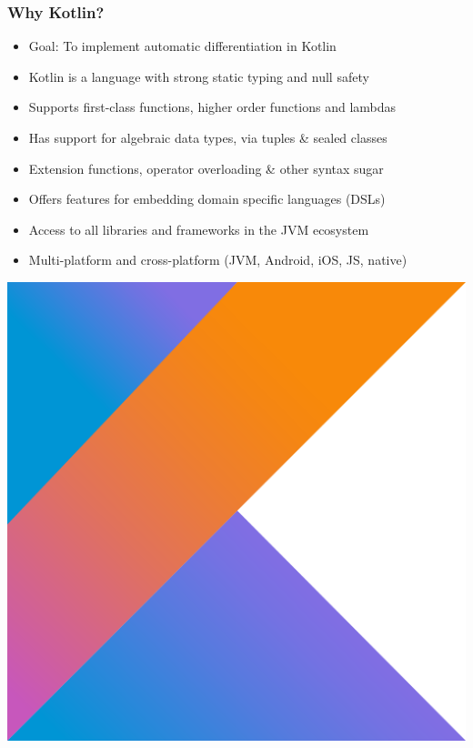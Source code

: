 \documentclass{beamer}
\begin{document}

    \begin{frame}
        \frametitle{Why Kotlin?}
        \begin{itemize}
            \item Goal: To implement automatic differentiation in Kotlin
            \item Kotlin is a language with strong static typing and null safety
            \item Supports first-class functions, higher order functions and lambdas
            \item Has support for algebraic data types, via tuples & sealed classes
            \item Extension functions, operator overloading & other syntax sugar
            \item Offers features for embedding domain specific languages (DSLs)
            \item Access to all libraries and frameworks in the JVM ecosystem
            \item Multi-platform and cross-platform (JVM, Android, iOS, JS, native)
        \end{itemize}
        \begin{center}
            \includegraphics[scale=0.05]{kotlin.png}
        \end{center}
    \end{frame}
\end{document}
